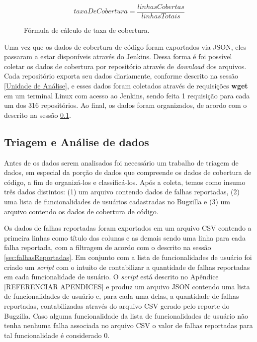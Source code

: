 \documentclass[11.5pt]{article}
\begin{document}
\begin{figure}[ht]
\caption{Fórmula de cálculo de taxa de cobertura.}
\label{fig:formulaTaxaDeCobertura}
    \[ taxaDeCobertura = \frac{linhasCobertas}{linhasTotais} \]
\end{figure}

Uma vez que os dados de cobertura de código foram exportados via JSON, eles passaram a estar
disponíveis através do Jenkins.
Dessa forma é foi possível coletar os dados de cobertura por repositório através de
\textit{download} dos arquivos.
Cada repositório exporta seu dados diariamente, conforme descrito na sessão
\ref{Unidade de Análise}, e esses dados foram coletados através de requisições \textbf{wget}
em um terminal Linux com acesso ao Jenkins, sendo feita 1 requisição para cada um dos 316
repositórios.
Ao final, os dados foram organizados, de acordo com o descrito na sessão \ref{sec:triagem}.



\subsection{Triagem e Análise de dados} \label{sec:triagem}

Antes de os dados serem analisados foi necessário um trabalho de triagem de dados, em especial da
porção de dados que compreende os dados de cobertura de código, a fim de organizá-los e
classificá-los.
Após a coleta, temos como insumo três dados distintos:
(1) um arquivo contendo dados de falhas reportadas,
(2) uma lista de funcionalidades de usuários cadastradas no Bugzilla e
(3) um arquivo contendo os dados de cobertura de código.

Os dados de falhas reportadas foram exportados em um arquivo CSV contendo a primeira linhas como
título das colunas e as demais sendo uma linha para cada falha reportada, com a filtragem de acordo
com o descrito na sessão \ref{sec:falhasReportadas}.
Em conjunto com a lista de funcionalidades de usuário foi criado um \textit{script} com o intuito
de contabilizar a quantidade de falhas reportadas em cada funcionalidade de usuário.
O \textit{script} está descrito no Apêndice [REFERENCIAR APENDICES] e produz um arquivo JSON
contendo uma lista de funcionalidades de usuário e, para cada uma delas, a quantidade de falhas
reportadas, contabilizadas através do arquivo CSV gerado pelo reporte do Bugzilla. Caso alguma
funcionalidade da lista de funcionalidades de usuário não tenha nenhuma falha associada no arquivo
CSV o valor de falhas reportadas para tal funcionalidade é considerado 0.
\end{document}

